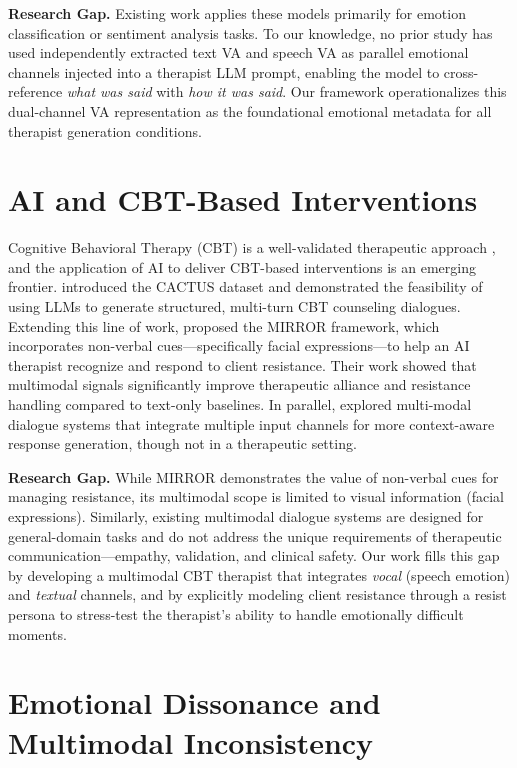 \textbf{Research Gap.} Existing work applies these models primarily for emotion classification or sentiment analysis tasks. To our knowledge, no prior study has used independently extracted text VA and speech VA as parallel emotional channels injected into a therapist LLM prompt, enabling the model to cross-reference \emph{what was said} with \emph{how it was said}. Our framework operationalizes this dual-channel VA representation as the foundational emotional metadata for all therapist generation conditions.

\section{AI and CBT-Based Interventions}

Cognitive Behavioral Therapy (CBT) is a well-validated therapeutic approach \cite{shahrokhian2021effects}, and the application of AI to deliver CBT-based interventions is an emerging frontier. \cite{lee2024cactus} introduced the CACTUS dataset and demonstrated the feasibility of using LLMs to generate structured, multi-turn CBT counseling dialogues. Extending this line of work, \cite{kim-etal-2025-mirror} proposed the MIRROR framework, which incorporates non-verbal cues---specifically facial expressions---to help an AI therapist recognize and respond to client resistance. Their work showed that multimodal signals significantly improve therapeutic alliance and resistance handling compared to text-only baselines. In parallel, \cite{yan-etal-2024-talk} explored multi-modal dialogue systems that integrate multiple input channels for more context-aware response generation, though not in a therapeutic setting.

\textbf{Research Gap.} While MIRROR demonstrates the value of non-verbal cues for managing resistance, its multimodal scope is limited to visual information (facial expressions). Similarly, existing multimodal dialogue systems \cite{yan-etal-2024-talk} are designed for general-domain tasks and do not address the unique requirements of therapeutic communication---empathy, validation, and clinical safety. Our work fills this gap by developing a multimodal CBT therapist that integrates \emph{vocal} (speech emotion) and \emph{textual} channels, and by explicitly modeling client resistance through a resist persona to stress-test the therapist's ability to handle emotionally difficult moments.

\section{Emotional Dissonance and Multimodal Inconsistency}


